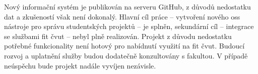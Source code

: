 Nový informační systém je publikován na serveru GitHub, z důvodů nedostatku dat a zkušeností však není dokonalý. Hlavní cíl práce -- vytvoření nového \gls{oss} nástroje pro správu studentských projektů -- je splněn, sekundární cíl -- integrace se službami \gls{fit} \gls{čvut} -- nebyl plně realizován. Projekt z důvodu nedostatku potřebné funkcionality není hotový pro nabídnutí využití na \gls{fit} \gls{čvut}. Budoucí rozvoj a uplatnění služby budou dodatečně konzultovány s fakultou. V případě neúspěchu bude projekt nadále vyvíjen nezávisle.